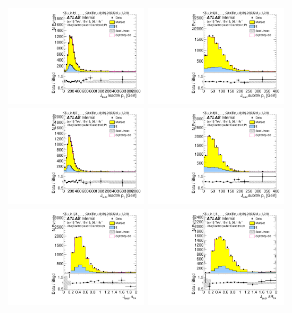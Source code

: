 \begin{figure}[htbp!]
\begin{center}
\includegraphics[width=0.32\textwidth,angle=-90]{figures/boosted/Control/b77_TwoTag_split_Control_leadHCand_trk0_Pt.pdf}
\includegraphics[width=0.32\textwidth,angle=-90]{figures/boosted/Control/b77_TwoTag_split_Control_leadHCand_trk1_Pt.pdf}\\
\includegraphics[width=0.32\textwidth,angle=-90]{figures/boosted/Control/b77_TwoTag_split_Control_sublHCand_trk0_Pt.pdf}
\includegraphics[width=0.32\textwidth,angle=-90]{figures/boosted/Control/b77_TwoTag_split_Control_sublHCand_trk1_Pt.pdf}\\
\includegraphics[width=0.32\textwidth,angle=-90]{figures/boosted/Control/b77_TwoTag_split_Control_leadHCand_trk_dr.pdf}
\includegraphics[width=0.32\textwidth,angle=-90]{figures/boosted/Control/b77_TwoTag_split_Control_sublHCand_trk_dr.pdf}

\end{center}
\end{figure}
